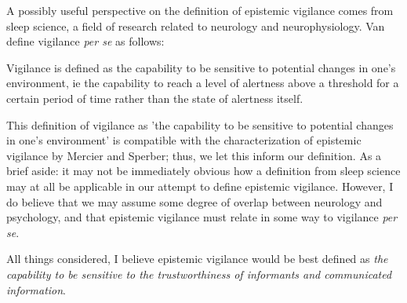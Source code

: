 A possibly useful perspective on the definition of epistemic vigilance comes from sleep science, a field of research related to neurology and neurophysiology. Van~\citet{VanSchie21} define vigilance \emph{per se} as follows:
\begin{quoting}
    Vigilance is defined as the capability to be sensitive to potential changes in one's environment, ie the capability to reach a level of alertness above a threshold for a certain period of time rather than the state of alertness itself.
\end{quoting}
This definition of vigilance as 'the capability to be sensitive to potential changes in one's environment' is compatible with the characterization of epistemic vigilance by Mercier and Sperber; thus, we let this inform our definition.
As a brief aside: it may not be immediately obvious how a definition from sleep science may at all be applicable in our attempt to define epistemic vigilance. However, I do believe that we may assume some degree of overlap between neurology and psychology, and that epistemic vigilance must relate in some way to vigilance \emph{per se}.

All things considered, I believe epistemic vigilance would be best defined as \emph{the capability to be sensitive to the trustworthiness of informants and communicated information}.

